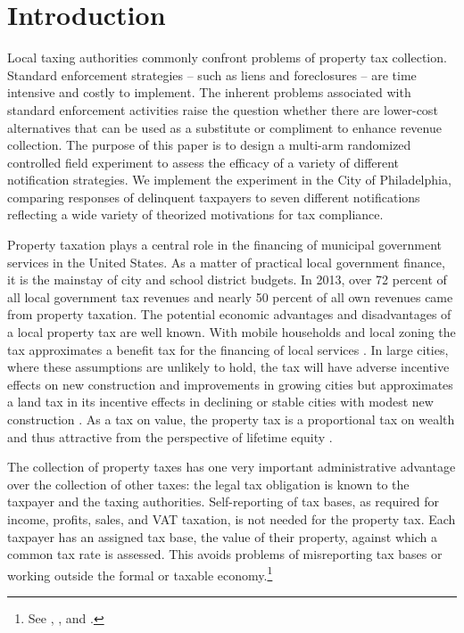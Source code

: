 \documentclass[12pt]{article}
\begin{document}
\section{Introduction}

Local taxing authorities commonly confront
problems of property tax collection. Standard enforcement strategies
-- such as liens and foreclosures -- are time intensive and costly to implement. 
The inherent problems associated with standard enforcement activities
raise the question whether there are lower-cost alternatives that can be
used as a substitute or compliment to enhance revenue collection.
The purpose of this paper is to design a multi-arm randomized controlled
field experiment to assess the efficacy of a variety of different 
notification strategies. We implement the experiment in the City of Philadelphia,
comparing responses of delinquent taxpayers to seven different
notifications reflecting a wide variety of theorized motivations for
tax compliance. 

Property taxation plays a central role in the financing of municipal
government services in the United States. As a matter of practical
local government finance, it is the mainstay of city and school
district budgets.  In 2013, over 72 percent of all local government
tax revenues and nearly 50 percent of all own revenues came from
property taxation. The potential economic advantages and disadvantages
of a local property tax are well known.  With mobile households and
local zoning the tax approximates a benefit tax for the financing of
local services \cite{Hamilton-75}.  In large cities, where these assumptions are unlikely
to hold, the tax will have adverse incentive effects on new
construction and improvements in growing cities but approximates a
land tax in its incentive effects in declining or stable cities with
modest new construction \cite{Aaron-75}.  As a tax on value, the
property tax is a proportional tax on wealth and thus attractive from
the perspective of lifetime equity \cite{Mieszkowski-72}.

The collection of property taxes has one very important administrative
advantage over the collection of other taxes: the legal tax obligation
is known to the taxpayer and the taxing authorities.  Self-reporting
of tax bases, as required for income, profits, sales, and VAT
taxation, is not needed for the property tax. Each taxpayer has an
assigned tax base, the value of their property, against which a common tax
rate is assessed.  This avoids problems of misreporting tax bases or
working outside the formal or  taxable economy.\footnote{See
  , , and .}
\end{document}
